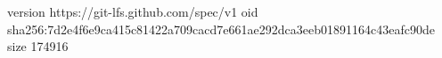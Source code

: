 version https://git-lfs.github.com/spec/v1
oid sha256:7d2e4f6e9ca415c81422a709cacd7e661ae292dca3eeb01891164c43eafc90de
size 174916
